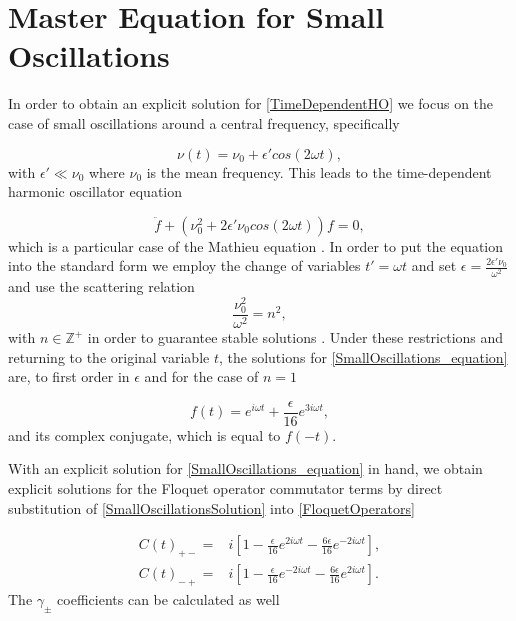 \documentclass[reprint, amsmath,amssymb, aps,pra]{revtex4-1}
\begin{document}
\appendix


\section{Master Equation for Small Oscillations}\label{App2}

In order to obtain an explicit solution for \eqref{TimeDependentHO} we
focus on the case of small oscillations around a central frequency,
specifically

\begin{equation}\label{SmallOscillationsTDHO}
\nu(t) = \nu_0 + \epsilon' cos(2\omega t),
\end{equation}
with $\epsilon' \ll \nu_0$ where $\nu_0$ is the mean frequency. This
leads to the time-dependent harmonic oscillator equation

\begin{equation}\label{SmallOscillations_equation}
\ddot{f} + (\nu_0^2 + 2\epsilon' \nu_0 cos(2\omega t))f = 0,
\end{equation}
which is a particular case of the Mathieu equation \cite{PiatekME}. In
order to put the equation into the standard form we employ the change
of variables $t'= \omega t$ and set
$\epsilon = \frac{2\epsilon' \nu_0}{\omega^2}$ and use the scattering
relation
\begin{equation}
\frac{\nu_0^2}{\omega^2} = n^2,\label{scattering}
\end{equation}
with $n \in \mathbb{Z}^+$ in order to guarantee stable solutions
\cite{WardFT}. Under these restrictions and returning to the original
variable $t$, the solutions for \eqref{SmallOscillations_equation}
are, to first order in $\epsilon$ and for the case of $n=1$

\begin{equation}\label{SmallOscillationsSolution}
f(t)=  e^{i\omega t} + \frac{\epsilon}{16} e^{3i\omega t},
\end{equation} and its complex conjugate, which is equal to $f(-t)$. 



With an explicit solution for \eqref{SmallOscillations_equation} in
hand, we obtain explicit solutions for the Floquet operator commutator
terms by direct substitution of \eqref{SmallOscillationsSolution} into
\eqref{FloquetOperators} \cite{TesisMaestria}

\begin{align}
C(t)_{+-} =& i [1 -\frac{\epsilon}{16}e^{2i\omega t}-\frac{6\epsilon}{16}e^{-2i\omega t}],\\
C(t)_{-+} =& i [1 -\frac{\epsilon}{16}e^{-2i\omega t}-\frac{6\epsilon}{16}e^{2i\omega t}].
\end{align} The $\gamma_{\pm}$ coefficients can be calculated as well
\end{document}
